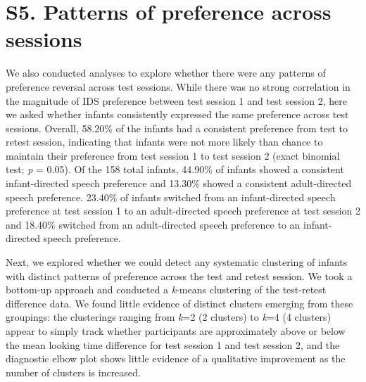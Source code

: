 \documentclass[
  man, donotrepeattitle,floatsintext]{apa6}
\begin{document}
\hypertarget{s5.-patterns-of-preference-across-sessions}{%
\section{S5. Patterns of preference across sessions}\label{s5.-patterns-of-preference-across-sessions}}

We also conducted analyses to explore whether there were any patterns of preference reversal across test sessions.
While there was no strong correlation in the magnitude of IDS preference between test session 1 and test session 2, here we asked whether infants consistently expressed the same preference across test sessions.
Overall, 58.20\% of the infants had a consistent preference from test to retest session, indicating that infants were not more likely than chance to maintain their preference from test session 1 to test session 2 (exact binomial test; \emph{p} =
0.05).
Of the 158 total infants, 44.90\% of infants showed a consistent infant-directed speech preference and 13.30\% showed a consistent adult-directed speech preference.
23.40\% of infants switched from an infant-directed speech preference at test session 1 to an adult-directed speech preference at test session 2 and 18.40\% switched from an adult-directed speech preference to an infant-directed speech preference.

Next, we explored whether we could detect any systematic clustering of infants with distinct patterns of preference across the test and retest session.
We took a bottom-up approach and conducted a \emph{k}-means clustering of the test-retest difference data.
We found little evidence of distinct clusters emerging from these groupings: the clusterings ranging from \emph{k}=2 (2 clusters) to \emph{k}=4 (4 clusters) appear to simply track whether participants are approximately above or below the mean looking time difference for test session 1 and test session 2, and the diagnostic elbow plot shows little evidence of a qualitative improvement as the number of clusters is increased.
\end{document}
